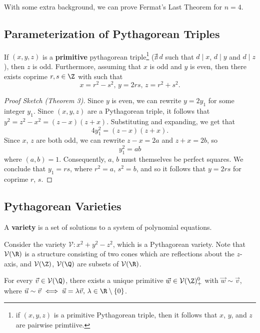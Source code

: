 \documentclass[11pt]{article}
\begin{document}
With some extra background, we can prove Fermat's Last Theorem for $n = 4$.

\subsection{Parameterization of Pythagorean Triples}

\begin{theorem}
If $(x, y, z)$ is a \textbf{primitive} pythagorean triple\footnote{if $(x, y, z)$ is a primitive Pythagorean triple, then it follows that $x$, $y$, and $z$ are pairwise primtiive.    
} ($\nexists \, d$ such that $d \mid x$, $d\mid y$ and $d \mid z$), then $z$ is odd. Furthermore, assuming that
$x$ is odd and $y$ is even, then there exists coprime $r, s \in \Z$ with such that
\[ x = r^2 - s^2, \, y = 2rs, \, z = r^2 + s^2. \]
\end{theorem}

\begin{proof}[Proof Sketch (Theorem 3)]
Since $y$ is even, we can rewrite $y = 2y_1$ for some integer $y_1$. Since $(x, y, z)$ are a Pythagorean triple, it follows that
\( y^2 = z^2 - x^2 = (z-x)(z+x). \) Substituting and expanding, we get that 
\[
    4y_1^2 = (z-x)(z+x).
\] 
Since $x$, $z$ are both odd, we can rewrite $z-x = 2a$ and $z+x =2b$, so 
\[ y_1^2 = ab\] where $(a, b) = 1$. Consequently, $a$, $b$ must themselves be perfect squares. We conclude that $y_1=rs$, where $r^2 = a$, $s^2=b$, and so it follows that
$y = 2rs$ for coprime $r$, $s$. 
\end{proof}

\subsection{Pythagorean Varieties}

\begin{definition}[Variety]
A \textbf{variety} is a set of solutions to a system of polynomial equations.
\end{definition}

Consider the variety $\mathcal{V}: x^2 + y^2 - z^2$, which is a Pythagorean variety. Note that
$\mathcal{V}(\R)$ is a structure consisting of two cones which are reflections about the $z$-axis,
and $ \mathcal{V}(\Z)$, $\mathcal{V}(\Q)$ are subsets of $\mathcal{V} (\R)$.

\begin{lemma*}
For every $\vec{v} \in \mathcal{V}(\Q)$, there exists a unique primitive $\vec{w} \in \mathcal{V}(\Z)_+^{0}$ with $\vec{w} \sim \vec{v}$, where
$\vec{u} \sim \vec{v} \iff \vec{u} = \lambda\vec{v}, \, \lambda \in \R \setminus \{ 0\}$.
\end{lemma*}
\end{document}
